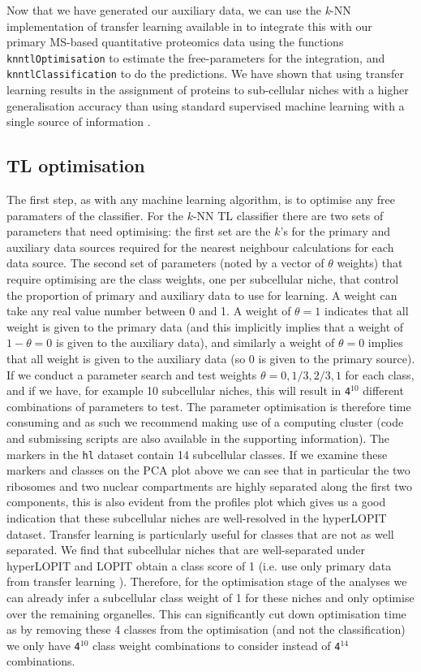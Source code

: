 Now that we have generated our auxiliary data, we can use the
\textit{k}-NN implementation of transfer learning available in
 to integrate this with our primary MS-based
quantitative proteomics data using the functions
\texttt{knntlOptimisation} to estimate the free-parameters for the
integration, and \texttt{knntlClassification} to do the
predictions. We have shown that using transfer learning results in the
assignment of proteins to sub-cellular niches with a higher
generalisation accuracy than using standard supervised machine
learning with a single source of information \cite{Breckels:2016}.

\subsection*{TL optimisation}

The first step, as with any machine learning algorithm, is to optimise
any free paramaters of the classifier. For the $k$-NN TL classifier
there are two sets of parameters that need optimising: the first set
are the $k$'s for the primary and auxiliary data sources required for
the nearest neighbour calculations for each data source. The second
set of parameters (noted by a vector of $\theta$ weights) that require
optimising are the class weights, one per subcellular niche, that
control the proportion of primary and auxiliary data to use for
learning. A weight can take any real value number between 0 and 1. A
weight of $\theta = 1$ indicates that all weight is given to the
primary data (and this implicitly implies that a weight of
$1 - \theta = 0$ is given to the auxiliary data), and similarly a
weight of $\theta = 0$ implies that all weight is given to the
auxiliary data (so 0 is given to the primary source). If we conduct a
parameter search and test weights $\theta = {0, 1/3, 2/3, 1}$ for each
class, and if we have, for example 10 subcellular niches, this will
result in \texttt{4$^{10}$} different combinations of parameters to
test. The parameter optimisation is therefore time consuming and as
such we recommend making use of a computing cluster (code and
submissing scripts are also available in the supporting
information). The markers in the \texttt{hl} dataset contain 14
subcellular classes. If we examine these markers and classes on the
PCA plot above we can see that in particular the two ribosomes and two
nuclear compartments are highly separated along the first two
components, this is also evident from the profiles plot which gives us
a good indication that these subcellular niches are well-resolved in
the hyperLOPIT dataset. Transfer learning is particularly useful for
classes that are not as well separated. We find that subcellular
niches that are well-separated under hyperLOPIT and LOPIT obtain a
class score of 1 (i.e. use only primary data from transfer learning
\cite{Breckels:2016}). Therefore, for the optimisation stage of the
analyses we can already infer a subcellular class weight of 1 for
these niches and only optimise over the remaining organelles.  This
can significantly cut down optimisation time as by removing these 4
classes from the optimisation (and not the classification) we only
have \texttt{4$^{10}$} class weight combinations to consider instead
of \texttt{4$^{14}$} combinations.

